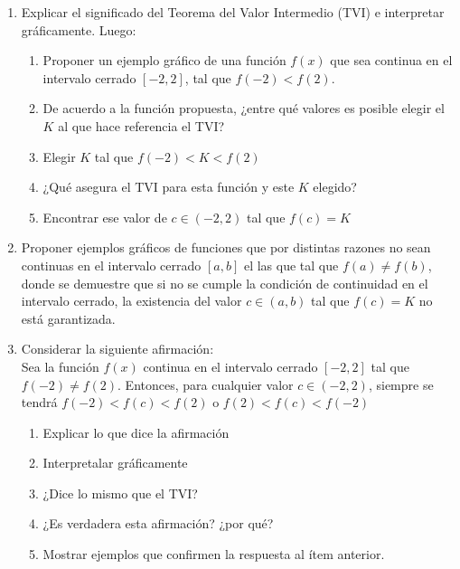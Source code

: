 \documentclass[12pt]{article}
\newtheorem*{myteo}{Teorema} %
\theoremstyle{definition}
\begin{document}
\begin{enumerate}
\vspace{0.3 cm}

\item  Explicar el significado del Teorema del Valor Intermedio (TVI) e interpretar gráficamente. Luego:
 \begin{enumerate}
\item  Proponer un ejemplo gráfico de  una función $f(x)$ que sea continua en el intervalo cerrado $[-2,2]$, tal que $f(-2) < f(2)$. 
\item De acuerdo a la función propuesta, ¿entre qué valores es posible elegir el $K$ al que hace referencia el TVI?
\item  Elegir $K$ tal que $f(-2) < K < f(2)$
\item ¿Qué asegura el TVI para esta función y este $K$ elegido?
\item Encontrar ese valor de $c \in (-2,2)$ tal que $f(c) = K$
\end{enumerate}
 
\item Proponer ejemplos gráficos de funciones que por distintas razones no sean continuas en el intervalo cerrado $[a, b]$  el las que  tal que $f(a) \neq f(b)$, donde se demuestre que si no se cumple la condición de continuidad en el intervalo cerrado, la existencia del valor $c \in (a, b)$ tal que $f(c) = K$ no está garantizada.

\item Considerar la siguiente afirmación:\\
Sea la función $f(x)$ continua en el intervalo cerrado $[-2,2]$ tal que $f(-2) \neq f(2)$. Entonces, para cualquier valor $c \in (-2,2)$, siempre se tendrá $f(-2) < f(c) < f(2)$ o $f(2) < f(c) < f(-2)$
 \begin{enumerate}
\item  Explicar lo que dice la afirmación
\item Interpretalar gráficamente
\item  ¿Dice lo mismo que el TVI?
\item ¿Es verdadera esta afirmación? ¿por qué?
\item Mostrar ejemplos que confirmen la respuesta al ítem anterior.
\end{enumerate}


\end{enumerate}
\end{document}
